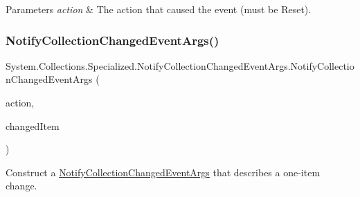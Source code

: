 \begin{DoxyParams}{Parameters}
{\em action} & The action that caused the event (must be Reset).\\
\hline
\end{DoxyParams}
\mbox{\label{class_system_1_1_collections_1_1_specialized_1_1_notify_collection_changed_event_args_a86b4fa9f38021e9e0d1018fbc5b11713}} 
\subsubsection{\texorpdfstring{Notify\+Collection\+Changed\+Event\+Args()}{NotifyCollectionChangedEventArgs()}\hspace{0.1cm}{\footnotesize\ttfamily [2/11]}}
{\footnotesize\ttfamily System.\+Collections.\+Specialized.\+Notify\+Collection\+Changed\+Event\+Args.\+Notify\+Collection\+Changed\+Event\+Args (\begin{DoxyParamCaption}\item[{\hyperlink{namespace_system_1_1_collections_1_1_specialized_a7e21ea761562ed22011c3120bbb31123}{Notify\+Collection\+Changed\+Action}}]{action,  }\item[{object}]{changed\+Item }\end{DoxyParamCaption})\hspace{0.3cm}{\ttfamily [inline]}}



Construct a \hyperlink{class_system_1_1_collections_1_1_specialized_1_1_notify_collection_changed_event_args}{Notify\+Collection\+Changed\+Event\+Args} that describes a one-\/item change. 


